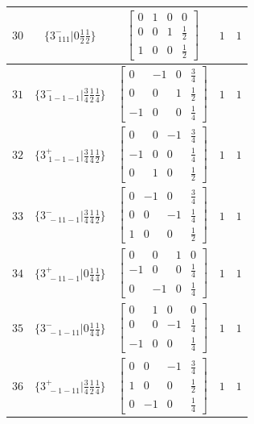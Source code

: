 \documentclass[fleqn,8pt]{jsarticle}
\begin{document}
\begin{longtable}{ccccc}
$ 30 $ & $ \{3^{-}_{\,\,111}|0 \frac{1}{2} \frac{1}{2}\} $ & $ \begin{bmatrix} 0 & 1 & 0 & 0 \\ 0 & 0 & 1 & \frac{1}{2} \\ 1 & 0 & 0 & \frac{1}{2} \end{bmatrix} $ & $ 1 $ & $ 1 $ \\ \hline
$ 31 $ & $ \{3^{-}_{\,\,1-1-1}|\frac{3}{4} \frac{1}{2} \frac{1}{4}\} $ & $ \begin{bmatrix} 0 & -1 & 0 & \frac{3}{4} \\ 0 & 0 & 1 & \frac{1}{2} \\ -1 & 0 & 0 & \frac{1}{4} \end{bmatrix} $ & $ 1 $ & $ 1 $ \\ \hline
$ 32 $ & $ \{3^{+}_{\,\,1-1-1}|\frac{3}{4} \frac{1}{4} \frac{1}{2}\} $ & $ \begin{bmatrix} 0 & 0 & -1 & \frac{3}{4} \\ -1 & 0 & 0 & \frac{1}{4} \\ 0 & 1 & 0 & \frac{1}{2} \end{bmatrix} $ & $ 1 $ & $ 1 $ \\ \hline
$ 33 $ & $ \{3^{-}_{\,\,-11-1}|\frac{3}{4} \frac{1}{4} \frac{1}{2}\} $ & $ \begin{bmatrix} 0 & -1 & 0 & \frac{3}{4} \\ 0 & 0 & -1 & \frac{1}{4} \\ 1 & 0 & 0 & \frac{1}{2} \end{bmatrix} $ & $ 1 $ & $ 1 $ \\ \hline
$ 34 $ & $ \{3^{+}_{\,\,-11-1}|0 \frac{1}{4} \frac{1}{4}\} $ & $ \begin{bmatrix} 0 & 0 & 1 & 0 \\ -1 & 0 & 0 & \frac{1}{4} \\ 0 & -1 & 0 & \frac{1}{4} \end{bmatrix} $ & $ 1 $ & $ 1 $ \\ \hline
$ 35 $ & $ \{3^{-}_{\,\,-1-11}|0 \frac{1}{4} \frac{1}{4}\} $ & $ \begin{bmatrix} 0 & 1 & 0 & 0 \\ 0 & 0 & -1 & \frac{1}{4} \\ -1 & 0 & 0 & \frac{1}{4} \end{bmatrix} $ & $ 1 $ & $ 1 $ \\ \hline
$ 36 $ & $ \{3^{+}_{\,\,-1-11}|\frac{3}{4} \frac{1}{2} \frac{1}{4}\} $ & $ \begin{bmatrix} 0 & 0 & -1 & \frac{3}{4} \\ 1 & 0 & 0 & \frac{1}{2} \\ 0 & -1 & 0 & \frac{1}{4} \end{bmatrix} $ & $ 1 $ & $ 1 $ \\ \hline

\end{longtable}
\end{document}
